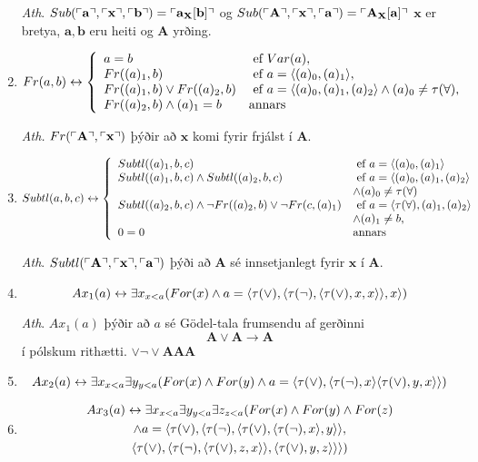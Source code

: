 \documentclass[12pt]{book}
\newcommand{\bA}{\mathbf{A}}
\newcommand{\ba}{\mathbf{a}}
\newcommand{\bb}{\mathbf{b}}
\newcommand{\bX}{\mathbf{X}}
\newcommand{\bx}{\mathbf{x}}
\DeclarePairedDelimiter{\god}{\ulcorner}{\urcorner}
\begin{document}
\begin{enumerate}[(1)]
\emph{Ath}. 
$Sub(\god{\ba},\god{\bx},\god{\bb}) = \god{\ba_{\bX} [\bb]}$
og
$Sub(\god{\bA},\god{\bx},\god{\ba}) = \god{\bA_{\bX} [\ba]}$
$\bx$ er bretya, $\ba, \bb$ eru heiti og $\bA$ yrðing.

\item 
\[Fr(a,b) \leftrightarrow \left\{ \begin{array}{l l} a = b & \text{ ef } Var(a),\\
Fr((a)_1,b) & \text{ ef } a = \langle(a)_0, (a)_1\rangle,\\
Fr((a)_1,b) \vee Fr((a)_2,b) & \text{ ef } a = \langle(a)_0, (a)_1,(a)_2\rangle \wedge (a)_0 \neq \tau(\forall),\\
Fr((a)_2,b) \wedge (a)_1 = b & \text{annars}
\end{array} \right.
\]

\emph{Ath.} $Fr(\god{\bA},\god{\bx})$ þýðir að $\bx$ komi fyrir frjálst í $\bA$.

\item 

\[
Subtl(a,b,c) \leftrightarrow \left\{ \begin{array}{l l}
Subtl((a)_1,b,c) & \text{ ef } a = \langle(a)_0, (a)_1\rangle\\
Subtl((a)_1,b,c) \wedge Subtl((a)_2,b,c) & \text{ ef } a = \langle(a)_0, (a)_1, (a)_2\rangle \\
& \wedge (a)_0 \neq \tau(\forall)\\
Subtl((a)_2,b,c) \wedge  \lnot Fr((a)_2,b) \vee \lnot Fr(c,(a)_1) & \text{ ef } a = \langle\tau(\forall), (a)_1, (a)_2\rangle\\
& \wedge (a)_1 \neq b,\\
0 = 0 & \text{annars}
\end{array} \right.
\]

\emph{Ath}. $Subtl(\god{\bA}, \god{\bx}, \god{\ba})$ þýði að
$\bA$ sé innsetjanlegt fyrir $\bx$ í $\bA$.

\item 

\[
Ax_1(a) \leftrightarrow \exists x_{x < a} (For(x) \wedge a = \langle\tau(\vee), \langle\tau(\lnot),\langle\tau(\vee),x,x\rangle\rangle,x\rangle)
\]

\emph{Ath}. $Ax_1(a)$ þýðir að $a$ sé Gödel-tala frumsendu af gerðinni
\[ \bA \vee \bA \to \bA\] í pólskum rithætti. $\vee \lnot \vee \bA \bA \bA$

\item 
\[
Ax_2(a) \leftrightarrow \exists x_{x < a} \exists y_{y < a} (For(x) \wedge For(y) \wedge
 a = \langle\tau(\vee), \langle\tau(\lnot),x\rangle \langle\tau(\vee),y,x\rangle\rangle)
\]

\item 
  \begin{gather*}
    Ax_3(a) \leftrightarrow \exists x_{x < a} \exists y_{y < a} \exists z_{z < a} (For(x) \wedge For(y) \wedge For(z)\\
    \wedge a = \langle\tau(\vee), \langle\tau(\lnot),\langle\tau(\vee), \langle\tau(\lnot),x\rangle,y\rangle\rangle,\\
      \langle\tau(\vee), \langle\tau(\lnot), \langle\tau(\vee),z,x\rangle\rangle, \langle\tau(\vee),y,z\rangle\rangle\rangle)
\end{gather*}


\end{enumerate}
\end{document}
